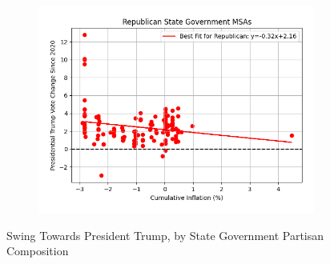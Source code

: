 \documentclass{article}
\begin{document}
\begin{figure}[ht]
\begin{subfigure}[b]{0.4\textwidth}
    \centering
    \includegraphics[width=\textwidth]{pres_goods_R_msa_swing_scatter.png}
\end{subfigure}
\caption{Swing Towards President Trump, by State Government Partisan Composition}
\end{figure}
\end{document}
